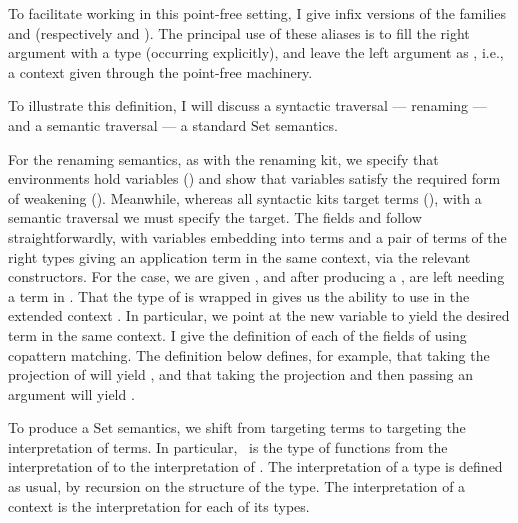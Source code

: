 To facilitate working in this point-free setting, I give infix versions of
the families \AgdaBound{$\V$} and \AgdaBound{$\C$} (respectively
\AgdaFunction{\_$\V\vDash$\_} and \AgdaFunction{\_$\C\vDash$\_}).
The principal use of these aliases is to fill the right argument with a type
(occurring explicitly), and leave the left argument as \AgdaFunction{\_}, i.e.,
a context given through the point-free machinery.


To illustrate this definition, I will discuss a syntactic traversal ---
renaming --- and a semantic traversal --- a standard $\mathrm{Set}$ semantics.

For the renaming semantics, as with the renaming kit, we specify that
environments hold variables (\AgdaDatatype{\_$\ni$\_}) and show that variables
satisfy the required form of weakening ().
Meanwhile, whereas all syntactic kits target terms
(\AgdaDatatype{\_$\vdash$\_}), with a semantic traversal we must specify the
target.
The fields  and
 follow straightforwardly, with variables
embedding into terms and a pair of terms of the right types giving an
application term in the same context, via the relevant constructors.
For the  case, we are given
, and after producing a
, are left needing a term in
.
That the type of  is wrapped in \AgdaFunction{$\bigcirc$} gives
us the ability to use  in the extended context
.
In particular, we point at the new variable to yield the desired term in the
same context.
I give the definition of each of the fields of  using
copattern matching.
The definition below defines, for example, that taking the
 projection of  will
yield , and that taking the
 projection and then passing an argument
 will yield \AgdaSpace{}%
\AgdaSymbol{(}\AgdaSpace{}\AgdaSymbol{(}%
\AgdaSpace{}\AgdaSymbol{)}%
\AgdaSymbol{)}.


To produce a $\mathrm{Set}$ semantics, we shift from targeting terms to
targeting the interpretation of terms.
In particular, \ is the type of functions
from the interpretation of \AgdaBound{$\Gamma$} to the interpretation of
.
The interpretation of a type is defined as usual, by recursion on the structure
of the type.
The interpretation of a context is the interpretation for each of its types.

